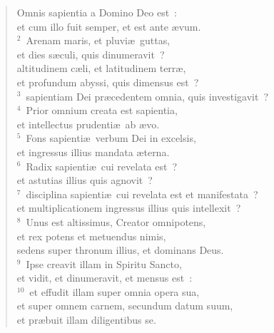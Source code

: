 \begin{flushleft}\begin{verse}\vspace{-19pt}Omnis sapientia a Domino Deo est~:\\ et cum illo fuit semper, et est ante \ae vum.\\
${}^{2}$~Arenam maris, et pluvi\ae\ guttas,\\ et dies s\ae culi, quis dinumeravit~?\\ altitudinem c\ae li, et latitudinem terr\ae ,\\ et profundum abyssi, quis dimensus est~?\\
${}^{3}$~sapientiam Dei pr\ae cedentem omnia, quis investigavit~?\\
${}^{4}$~Prior omnium creata est sapientia,\\ et intellectus prudenti\ae\ ab \ae vo.\\
${}^{5}$~Fons sapienti\ae\ verbum Dei in excelsis,\\ et ingressus illius mandata \ae terna.\\
${}^{6}$~Radix sapienti\ae\ cui revelata est~?\\ et astutias illius quis agnovit~?\\
${}^{7}$~disciplina sapienti\ae\ cui revelata est et manifestata~?\\ et multiplicationem ingressus illius quis intellexit~?\\
${}^{8}$~Unus est altissimus, Creator omnipotens,\\ et rex potens et metuendus nimis,\\ sedens super thronum illius, et dominans Deus.\\
${}^{9}$~Ipse creavit illam in Spiritu Sancto,\\ et vidit, et dinumeravit, et mensus est~:\\
${}^{10}$~et effudit illam super omnia opera sua,\\ et super omnem carnem, secundum datum suum,\\ et pr\ae buit illam diligentibus se.\end{verse}\end{flushleft}


